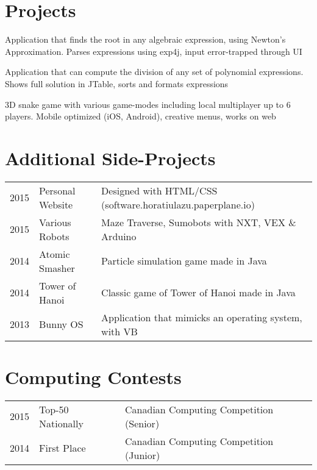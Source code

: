 \documentclass[]{deedy-resume-openfont}
\begin{document}
\begin{minipage}[t]{0.66\textwidth}

\section{Projects}
Application that finds the root in any algebraic expression, using Newton's Approximation. Parses expressions using exp4j, input error-trapped through UI
\sectionsep


Application that can compute the division of any set of polynomial expressions. Shows full solution in JTable, sorts and formats expressions
\sectionsep

3D snake game with various game-modes including local multiplayer up to 6 players. Mobile optimized (iOS, Android), creative menus, works on web
\sectionsep

\section{Additional Side-Projects} 

\begin{tabular}{rll}
2015 	& Personal Website    & Designed with HTML/CSS (software.horatiulazu.paperplane.io)\\
2015 	& Various Robots    & Maze Traverse, Sumobots with NXT, VEX \& Arduino\\
2014   & Atomic Smasher   & Particle simulation game made in Java\\
2014   &  Tower of Hanoi  & Classic game of Tower of Hanoi made in Java\\
2013   &  Bunny OS   & Application that mimicks an operating system, with VB\\
\end{tabular}
\sectionsep


\section{Computing Contests} 
\begin{tabular}{rll}
2015	     & Top-50 Nationally  & Canadian Computing Competition (Senior)\\
2014	     & First Place  & Canadian Computing Competition (Junior)\\
\end{tabular}
\sectionsep


\end{minipage}
\end{document}
